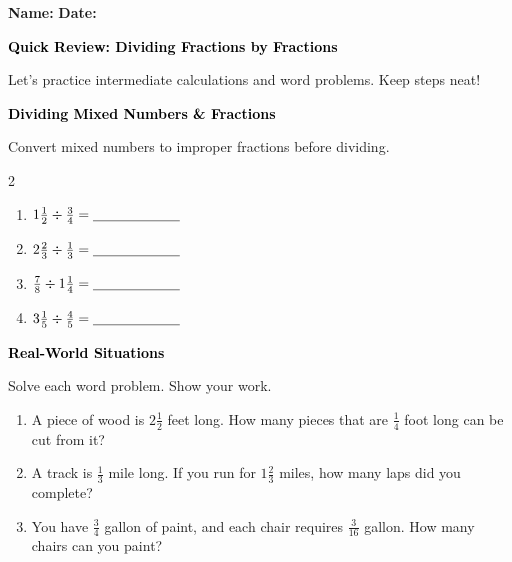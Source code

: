 \documentclass[12pt, letterpaper, fleqn]{article}
\newcommand{\blank}{\underline{\hspace{2.2cm}}}
\begin{document}
\textbf{Name:} \underline{\hspace{5cm}}
\hfill
\textbf{Date:} \underline{\hspace{3cm}}\\

\begin{tcolorbox}[colback=customteal!20]
    \large\textcolor{black}{\textbf{Quick Review: Dividing Fractions by Fractions}}
\end{tcolorbox}

\vspace{3mm}
\noindent
Let's practice intermediate calculations and word problems. Keep steps neat!

\vspace{4mm}

\begin{tcolorbox}[colback=customteal!20]
\large\textcolor{black}{\textbf{Dividing Mixed Numbers \& Fractions}}
\end{tcolorbox}

\noindent
Convert mixed numbers to improper fractions before dividing.

\vspace{3mm}
\begin{multicols}{2}
\begin{enumerate}[itemsep=1cm, leftmargin=0.6cm]
\item $1\frac{1}{2} \div \frac{3}{4} = \blank$
\item $2\frac{2}{3} \div \frac{1}{3} = \blank$
\item $\frac{7}{8} \div 1\frac{1}{4} = \blank$
\item $3\frac{1}{5} \div \frac{4}{5} = \blank$
\end{enumerate}
\end{multicols}
\newpage

\begin{tcolorbox}[colback=customteal!20]
\large\textcolor{black}{\textbf{Real-World Situations}}
\end{tcolorbox}

\noindent
Solve each word problem. Show your work.

\vspace{3mm}
\begin{enumerate}[itemsep=1.2cm, leftmargin=0.6cm]
\item A piece of wood is $2\frac{1}{2}$ feet long. How many pieces that are $\frac{1}{4}$ foot long can be cut from it?
\vspace{1cm}
\item A track is $\frac{1}{3}$ mile long. If you run for $1\frac{2}{3}$ miles, how many laps did you complete?
\vspace{1cm}
\item You have $\frac{3}{4}$ gallon of paint, and each chair requires $\frac{3}{16}$ gallon. How many chairs can you paint?
\vspace{1cm}
\end{enumerate}
\newpage
\end{document}
